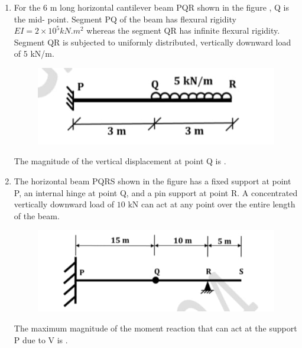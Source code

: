 \documentclass[journal,12pt,onecolumn]{article}
\theoremstyle{remark}
\begin{document}
\begin{enumerate}
    \hfill{}

    \item For the $6$ m long horizontal cantilever beam PQR shown in the figure , Q is the mid-
    point. Segment PQ of the beam has flexural rigidity $EI = 2 \times 10^5 kN. m^2$
    whereas the segment QR has infinite flexural rigidity. Segment QR is subjected to
    uniformly distributed, vertically downward load of $5$ kN/m.
    \begin{figure}[H]
        \centering
        \includegraphics[width=0.7\columnwidth]{figs/2Q49.jpg}
        \caption{}
        \label{fig:q49}
    \end{figure}
    
    The magnitude of the vertical displacement  at point Q is \underline{\hspace{2cm}} .
    
    \hfill{}

    \item The horizontal beam PQRS shown in the figure  has a fixed support at point P, an
    internal hinge at point Q, and a pin support at point R. A concentrated vertically
    downward load  of $10$ kN can act at any point over the entire length of the beam.
    \begin{figure}[H]
        \centering
        \includegraphics[width=0.7\columnwidth]{figs/2Q50.jpg}
        \caption{}
        \label{fig:q50}
    \end{figure}    
    The maximum magnitude of the moment reaction  that can act at the
    support P due to V is \underline{\hspace{2cm}} .
    

\end{enumerate}
\end{document}
